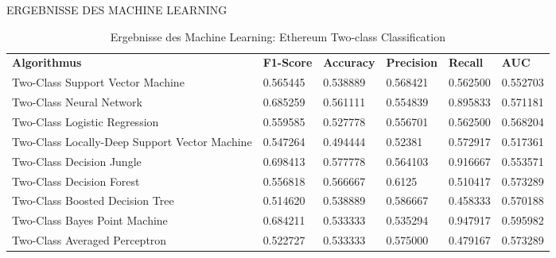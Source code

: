 {\normalsize ERGEBNISSE DES MACHINE LEARNING} \newline
\begin{table}[H]
\centering
\footnotesize
\begin{tabular}{|p{5cm}|p{}|p{}|p{}|p{}|p{}|}
\hline
\textbf{Algorithmus} & \textbf{F1-Score} & \textbf{Accuracy} & \textbf{Precision} & \textbf{Recall} & \textbf{AUC}\\ 
\hhline{======}
Two-Class Support Vector Machine & 0.565445 & 0.538889 & 0.568421 & 0.562500 & 0.552703 \\ \hline
Two-Class Neural Network & 0.685259 & 0.561111 & 0.554839 & 0.895833 & 0.571181 \\ \hline
Two-Class Logistic Regression & 0.559585 & 0.527778 & 0.556701 & 0.562500 & 0.568204 \\ \hline
Two-Class Locally-Deep Support Vector Machine & 0.547264 & 0.494444 & 0.52381 & 0.572917 & 0.517361 \\ \hline
Two-Class Decision Jungle & 0.698413 & 0.577778 & 0.564103 & 0.916667 & 0.553571 \\ \hline
Two-Class Decision Forest & 0.556818 & 0.566667 & 0.6125 & 0.510417 & 0.573289 \\ \hline
Two-Class Boosted Decision Tree & 0.514620 & 0.538889 & 0.586667 & 0.458333 & 0.570188 \\ \hline
Two-Class Bayes Point Machine & 0.684211 & 0.533333 & 0.535294 & 0.947917 & 0.595982 \\ \hline
Two-Class Averaged Perceptron & 0.522727 & 0.533333 & 0.575000 & 0.479167 & 0.573289 \\ \hline
\end{tabular}
\caption{Ergebnisse des Machine Learning: Ethereum Two-class Classification}
\end{table}

